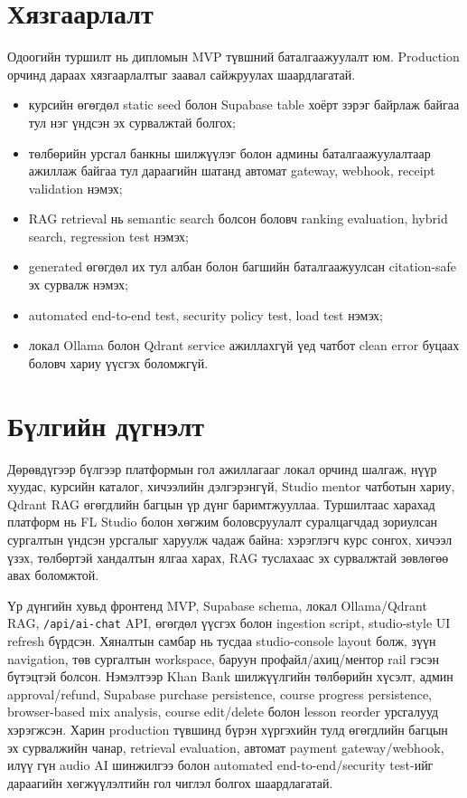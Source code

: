 \section{Хязгаарлалт}
Одоогийн туршилт нь дипломын MVP түвшний баталгаажуулалт юм. Production орчинд дараах хязгаарлалтыг заавал сайжруулах шаардлагатай.
\begin{itemize}
  \item курсийн өгөгдөл static seed болон Supabase table хоёрт зэрэг байрлаж байгаа тул нэг үндсэн эх сурвалжтай болгох;
  \item төлбөрийн урсгал банкны шилжүүлэг болон админы баталгаажуулалтаар ажиллаж байгаа тул дараагийн шатанд автомат gateway, webhook, receipt validation нэмэх;
  \item RAG retrieval нь semantic search болсон боловч ranking evaluation, hybrid search, regression test нэмэх;
  \item generated өгөгдөл их тул албан болон багшийн баталгаажуулсан citation-safe эх сурвалж нэмэх;
  \item automated end-to-end test, security policy test, load test нэмэх;
  \item локал Ollama болон Qdrant service ажиллахгүй үед чатбот clean error буцаах боловч хариу үүсгэх боломжгүй.
\end{itemize}

\section*{Бүлгийн дүгнэлт}
Дөрөвдүгээр бүлгээр платформын гол ажиллагааг локал орчинд шалгаж, нүүр хуудас, курсийн каталог, хичээлийн дэлгэрэнгүй, Studio mentor чатботын хариу, Qdrant RAG өгөгдлийн багцын үр дүнг баримтжууллаа. Туршилтаас харахад платформ нь FL Studio болон хөгжим боловсруулалт суралцагчдад зориулсан сургалтын үндсэн урсгалыг харуулж чадаж байна: хэрэглэгч курс сонгох, хичээл үзэх, төлбөртэй хандалтын ялгаа харах, RAG туслахаас эх сурвалжтай зөвлөгөө авах боломжтой.

Үр дүнгийн хувьд фронтенд MVP, Supabase schema, локал Ollama/Qdrant RAG, \texttt{/api/ai-chat} API, өгөгдөл үүсгэх болон ingestion script, studio-style UI refresh бүрдсэн. Хяналтын самбар нь тусдаа studio-console layout болж, зүүн navigation, төв сургалтын workspace, баруун профайл/ахиц/ментор rail гэсэн бүтэцтэй болсон. Нэмэлтээр Khan Bank шилжүүлгийн төлбөрийн хүсэлт, админ approval/refund, Supabase purchase persistence, course progress persistence, browser-based mix analysis, course edit/delete болон lesson reorder урсгалууд хэрэгжсэн. Харин production түвшинд бүрэн хүргэхийн тулд өгөгдлийн багцын эх сурвалжийн чанар, retrieval evaluation, автомат payment gateway/webhook, илүү гүн audio AI шинжилгээ болон automated end-to-end/security test-ийг дараагийн хөгжүүлэлтийн гол чиглэл болгох шаардлагатай.
